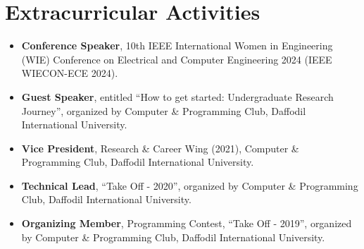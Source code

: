 \section{\textbf{Extracurricular Activities}}
\begin{itemize}[leftmargin=*,itemsep=2pt,parsep=0pt]
    \item \textbf{Conference Speaker}, 10th IEEE International Women in Engineering (WIE) Conference on Electrical and Computer Engineering 2024 (IEEE WIECON-ECE 2024).
    \item \textbf{Guest Speaker}, entitled “How to get started: Undergraduate Research Journey”, organized by Computer \& Programming Club, Daffodil International University.
    \item \textbf{Vice President}, Research \& Career Wing (2021), Computer \& Programming Club, Daffodil International University.
    \item \textbf{Technical Lead}, “Take Off - 2020”, organized by Computer \& Programming Club, Daffodil International University.
    \item \textbf{Organizing Member}, Programming Contest, “Take Off - 2019”, organized by Computer \& Programming Club, Daffodil International University.
\end{itemize}
